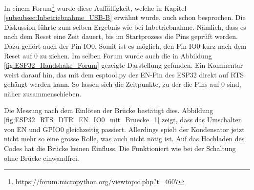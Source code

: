 In einem Forum\footnote{https://forum.micropython.org/viewtopic.php?t=4607} wurde diese Auffälligkeit, welche in Kapitel \ref{subsubsec:Inbetriebnahme_USB-B} erwähnt wurde, auch schon besprochen. Die Diskussion führte zum selben Ergebnis wie bei Inbetriebnahme. Nämlich, dass es nach dem Reset eine Zeit dauert, bis im Startprozess die Pins geprüft werden. Dazu gehört auch der Pin IO0. Somit ist es möglich, den Pin IO0 kurz nach dem Reset auf 0 zu ziehen.
Im selben Forum wurde auch die in Abbildung \ref{fig:ESP32_Handshake_Forum} gezeigte Darstellung gefunden. Ein Kommentar weist darauf hin, das mit dem esptool.py der EN-Pin des ESP32 direkt auf RTS gehängt werden kann. So lassen sich die Zeitpunkte, zu der die Pins auf 0 sind, näher zusammenschieben.

Die Messung nach dem Einlöten der Brücke bestätigt dies. Abbildung \ref{fig:ESP32_RTS_DTR_EN_IO0_mit_Bruecke_1} zeigt, dass das Umschalten von EN und GPIO0 gleichzeitig passiert. Allerdings spielt der Kondensator jetzt nicht mehr so eine grosse Rolle, was auch nicht nötig ist. Auf das Hochladen des Codes hat die Brücke keinen Einfluss. Die Funktioniert wie bei der Schaltung ohne Brücke einwandfrei.

